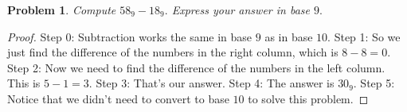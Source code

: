\documentclass{article}
\newtheorem{theorem}{Problem}
\begin{document}
\begin{theorem}
Compute $58_9 - 18_9.$ Express your answer in base $9.$
\end{theorem}

\begin{proof}
Step 0: Subtraction works the same in base $9$ as in base $10$.
Step 1: So we just find the difference of the numbers in the right column, which is $8-8=0$.
Step 2: Now we need to find the difference of the numbers in the left column. This is $5-1=3$.
Step 3: That's our answer.
Step 4: The answer is $30_9$.
Step 5: Notice that we didn't need to convert to base $10$ to solve this problem.
\end{proof}
\end{document}
